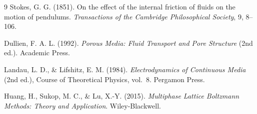 \begin{thebibliography}{9}
Stokes, G. G. (1851). On the effect of the internal friction of fluids on the motion of pendulums. \emph{Transactions of the Cambridge Philosophical Society}, 9, 8--106.

Dullien, F. A. L. (1992). \emph{Porous Media: Fluid Transport and Pore Structure} (2nd ed.). Academic Press.

Landau, L. D., \& Lifshitz, E. M. (1984). \emph{Electrodynamics of Continuous Media} (2nd ed.), Course of Theoretical Physics, vol.~8. Pergamon Press.

Huang, H., Sukop, M. C., \& Lu, X.-Y. (2015). \emph{Multiphase Lattice Boltzmann Methods: Theory and Application}. Wiley-Blackwell.


\end{thebibliography}
